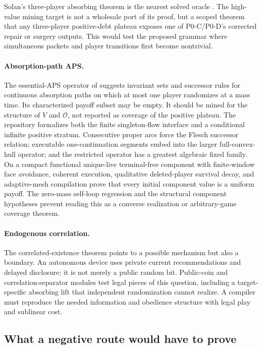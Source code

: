 \documentclass[11pt]{article}
\begin{document}
Solan's three-player absorbing theorem is the nearest solved oracle
\cite{Solan1999}.  The high-value mining target is not a wholesale port of its
proof, but a scoped theorem that any three-player positive-debt plateau exposes
one of P0-C/P0-D's corrected repair or surgery outputs.  This would test the
proposed grammar where simultaneous packets and player transitions first
become nontrivial.

\paragraph{Absorption-path APS.}
The essential-APS operator of \cite{AshkenaziGolanEtAl2026} suggests invariant
sets and successor rules for continuous absorption paths on which at most one
player randomizes at a mass time.  Its characterized payoff subset may be
empty.  It should be mined for the structure of $V$ and $\mathcal O$, not
reported as coverage of the positive plateau.  The repository formalizes both
the finite singleton-flow interface and a conditional infinite positive
stratum.  Consecutive proper arcs force the Flesch successor relation;
executable one-continuation segments embed into the larger full-convex-hull
operator; and the restricted operator has a greatest algebraic fixed family.
On a compact functional unique-live terminal-free component with finite-window
face avoidance, coherent execution, qualitative deleted-player survival decay,
and adaptive-mesh compilation prove that every initial component value
is a uniform payoff.  The zero-mass self-loop regression and the structural
component hypotheses prevent reading this as a converse realization or
arbitrary-game coverage theorem.

\paragraph{Endogenous correlation.}
The correlated-existence theorem points to a possible mechanism but also a
boundary.  An autonomous device uses private current recommendations and
delayed disclosure; it is not merely a public random bit.  Public-coin and
correlation-separator modules test legal pieces of this question, including a
target-specific absorbing lift that independent randomization cannot realize.
A compiler must reproduce the needed information and obedience structure with
legal play and sublinear cost.

\subsection{What a negative route would have to prove}
\end{document}
